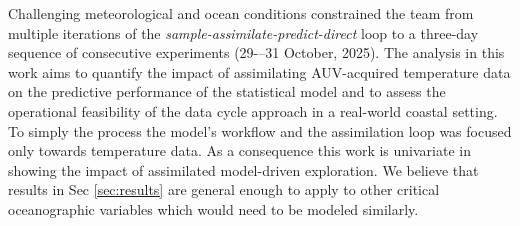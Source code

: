 





Challenging meteorological and ocean conditions constrained the team
from multiple iterations of the
\emph{sample-assimilate-predict-direct} loop to
a three-day sequence of consecutive experiments (29-–31 October,
2025). The analysis in this work aims to quantify the impact of
assimilating AUV-acquired temperature data on the predictive
performance of the statistical model and to assess the operational
feasibility of the data cycle approach in a real-world coastal
setting. To simply the process the model's workflow and the
assimilation loop was focused only towards temperature data. As a
consequence this work is univariate in showing the impact of
assimilated model-driven exploration. We believe that results in Sec
\ref{sec:results} are general enough to apply to other critical
oceanographic variables which would need to be modeled similarly.


